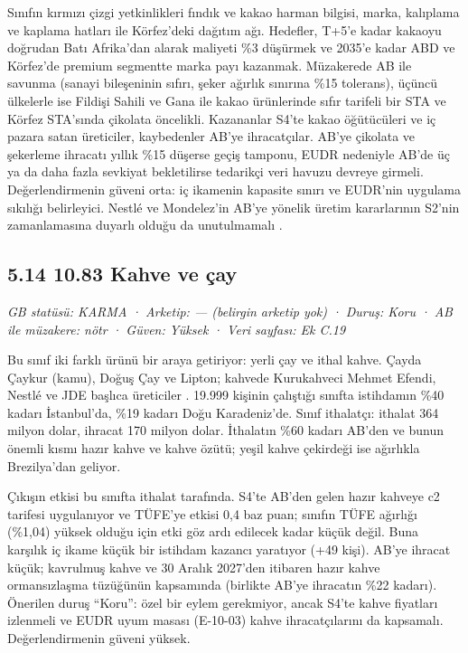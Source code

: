 Sınıfın kırmızı çizgi yetkinlikleri fındık ve kakao harman bilgisi, marka, kalıplama ve kaplama hatları ile Körfez'deki dağıtım ağı. Hedefler, T+5'e kadar kakaoyu doğrudan Batı Afrika'dan alarak maliyeti \%3 düşürmek ve 2035'e kadar ABD ve Körfez'de premium segmentte marka payı kazanmak. Müzakerede AB ile savunma (sanayi bileşeninin sıfırı, şeker ağırlık sınırına \%15 tolerans), üçüncü ülkelerle ise Fildişi Sahili ve Gana ile kakao ürünlerinde sıfır tarifeli bir STA ve Körfez STA'sında çikolata öncelikli. Kazananlar S4'te kakao öğütücüleri ve iç pazara satan üreticiler, kaybedenler AB'ye ihracatçılar. AB'ye çikolata ve şekerleme ihracatı yıllık \%15 düşerse geçiş tamponu, EUDR nedeniyle AB'de üç ya da daha fazla sevkiyat bekletilirse tedarikçi veri havuzu devreye girmeli. Değerlendirmenin güveni orta: iç ikamenin kapasite sınırı \etiketD{} ve EUDR'nin uygulama sıkılığı \etiketH{} belirleyici. Nestlé ve Mondelez'in AB'ye yönelik üretim kararlarının S2'nin zamanlamasına duyarlı olduğu da unutulmamalı \etiketH{}.

\hypertarget{nace_kartlar_10-12-514-1083-kahve-ve-uxe7ay}{%
\subsection{5.14 10.83 Kahve ve çay}\label{nace_kartlar_10-12-514-1083-kahve-ve-uxe7ay}}

\emph{GB statüsü: KARMA · Arketip: --- (belirgin arketip yok) · Duruş: Koru · AB ile müzakere: nötr · Güven: Yüksek · Veri sayfası: Ek C.19}

Bu sınıf iki farklı ürünü bir araya getiriyor: yerli çay ve ithal kahve. Çayda Çaykur (kamu), Doğuş Çay ve Lipton; kahvede Kurukahveci Mehmet Efendi, Nestlé ve JDE başlıca üreticiler \etiketH{}. 19.999 kişinin çalıştığı sınıfta istihdamın \%40 kadarı İstanbul'da, \%19 kadarı Doğu Karadeniz'de. Sınıf ithalatçı: ithalat 364 milyon dolar, ihracat 170 milyon dolar. İthalatın \%60 kadarı AB'den ve bunun önemli kısmı hazır kahve ve kahve özütü; yeşil kahve çekirdeği ise ağırlıkla Brezilya'dan geliyor.

Çıkışın etkisi bu sınıfta ithalat tarafında. S4'te AB'den gelen hazır kahveye c2 tarifesi uygulanıyor ve TÜFE'ye etkisi 0,4 baz puan; sınıfın TÜFE ağırlığı (\%1,04) yüksek olduğu için etki göz ardı edilecek kadar küçük değil. Buna karşılık iç ikame küçük bir istihdam kazancı yaratıyor (+49 kişi). AB'ye ihracat küçük; kavrulmuş kahve ve 30 Aralık 2027'den itibaren hazır kahve ormansızlaşma tüzüğünün kapsamında (birlikte AB'ye ihracatın \%22 kadarı). Önerilen duruş ``Koru'': özel bir eylem gerekmiyor, ancak S4'te kahve fiyatları izlenmeli ve EUDR uyum masası (E-10-03) kahve ihracatçılarını da kapsamalı. Değerlendirmenin güveni yüksek.

